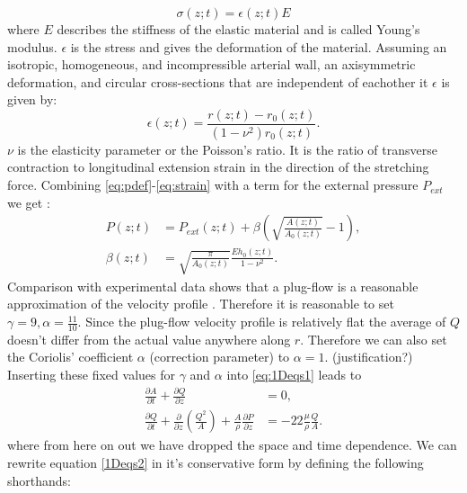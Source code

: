 \documentclass[a4paper, oneside]{discothesis}
\begin{document}
\begin{equation}
	\sigma(z;t) = \epsilon(z;t) E \label{eq:stress}
\end{equation}
where $E$ describes the stiffness of the elastic material and is called Young's modulus.
$\epsilon$ is the stress and gives the deformation of the material.
Assuming an isotropic, homogeneous, and incompressible arterial wall, an axisymmetric deformation, and circular cross-sections that are independent of eachother it $\epsilon$ is given by:
\begin{equation}
	\epsilon(z;t) = \frac{r(z;t)-r_0(z;t)}{ (1-\nu^2) r_0(z;t)}. \label{eq:strain}
\end{equation}
$\nu$ is the elasticity parameter or the Poisson's ratio.
It is the ratio of transverse contraction to longitudinal extension strain in the direction of the stretching force.
Combining \autoref{eq:pdef}-\autoref{eq:strain} with a term for the external pressure $P_{ext}$ we get \cite{sherwin2003one} \cite{sherwin2003computational}: 
\begin{align} 
	P(z;t) &= P_{ext}(z;t) + \beta \left( \sqrt{\frac{A(z;t)}{A_0(z;t)}} - 1 \right), \\
	\beta(z;t) &= \sqrt{\frac{\pi}{A_0(z;t)}} \frac{E h_0(z;t)}{1-\nu^2}.
\end{align}
Comparison with experimental data shows that a plug-flow is a reasonable approximation of the velocity profile \cite{hunter1972numerical} \cite{smith2000generation} \cite{smith2002anatomically}.
Therefore it is reasonable to set $\gamma = 9, \alpha = \frac{11}{10}$.
Since the plug-flow velocity profile is relatively flat the average of $Q$ doesn't differ from the actual value anywhere along $r$.
Therefore we can also set the Coriolis' coefficient $\alpha$ (correction parameter) to $\alpha = 1$. (justification?)
Inserting these fixed values for $\gamma$ and $\alpha$ into  \autoref{eq:1Deqs1} leads to 
\begin{equation}
		\begin{aligned} 
			\frac{\partial A}{\partial t} + \frac{\partial Q}{\partial z} &= 0, \\ 
			\frac{\partial Q}{\partial t} + \frac{\partial}{\partial z}\left(\frac{Q^2}{A} \right) + \frac{A}{\rho} \frac{\partial P}{\partial z} &= -22 \frac{\mu}{\rho} \frac{Q}{A}.
		\end{aligned} \label{1Deqs2}
\end{equation}
where from here on out we have dropped the space and time dependence.
We can rewrite equation \ref{1Deqs2} in it's conservative form by defining the following shorthands:
\end{document}
